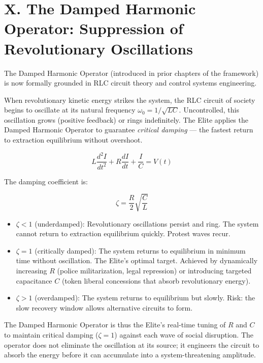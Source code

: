 \documentclass[12pt]{book}
\numberwithin{equation}{chapter}
\begin{document}
\section{X. The Damped Harmonic Operator: Suppression of Revolutionary Oscillations}

    The Damped Harmonic Operator (introduced in prior chapters of the framework) is now formally grounded in RLC circuit theory and control systems engineering.
  

    When revolutionary kinetic energy strikes the system, the RLC circuit of society begins to oscillate at its natural frequency $\omega_0 = 1/\sqrt{LC}$. Uncontrolled, this oscillation grows (positive feedback) or rings indefinitely. The Elite applies the Damped Harmonic Operator to guarantee \emph{critical damping} — the fastest return to extraction equilibrium without overshoot.
  

\begin{equation}
 L\frac{d^2I}{dt^2} + R\frac{dI}{dt} + \frac{I}{C} = V(t) 
\label{eq:UEF-4:_RLC_Damped_Oscillator}
\end{equation}

The damping coefficient is:

\begin{equation}
 \zeta = \frac{R}{2}\sqrt{\frac{C}{L}} 
\end{equation}

\begin{itemize}

\item $\zeta < 1$ (underdamped): Revolutionary oscillations persist and ring. The system cannot return to extraction equilibrium quickly. Protest waves recur.

\item $\zeta = 1$ (critically damped): The system returns to equilibrium in minimum time without oscillation. The Elite's optimal target. Achieved by dynamically increasing $R$ (police militarization, legal repression) or introducing targeted capacitance $C$ (token liberal concessions that absorb revolutionary energy).

\item $\zeta > 1$ (overdamped): The system returns to equilibrium but slowly. Risk: the slow recovery window allows alternative circuits to form.

\end{itemize}

    The Damped Harmonic Operator is thus the Elite's real-time tuning of $R$ and $C$ to maintain critical damping ($\zeta = 1$) against each wave of social disruption. The operator does not eliminate the oscillation at its source; it engineers the circuit to absorb the energy before it can accumulate into a system-threatening amplitude.
  
\end{document}
